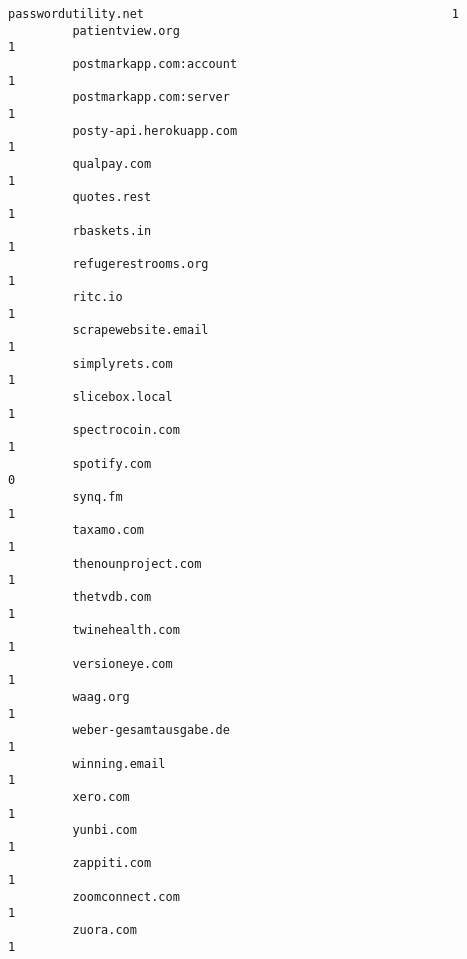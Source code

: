 \documentclass[11pt]{article}
\begin{document}
\begin{Verbatim}[commandchars=\\\{\}]
         passwordutility.net                                           1   
         patientview.org                                               1   
         postmarkapp.com:account                                       1   
         postmarkapp.com:server                                        1   
         posty-api.herokuapp.com                                       1   
         qualpay.com                                                   1   
         quotes.rest                                                   1   
         rbaskets.in                                                   1   
         refugerestrooms.org                                           1   
         ritc.io                                                       1   
         scrapewebsite.email                                           1   
         simplyrets.com                                                1   
         slicebox.local                                                1   
         spectrocoin.com                                               1   
         spotify.com                                                   0   
         synq.fm                                                       1   
         taxamo.com                                                    1   
         thenounproject.com                                            1   
         thetvdb.com                                                   1   
         twinehealth.com                                               1   
         versioneye.com                                                1   
         waag.org                                                      1   
         weber-gesamtausgabe.de                                        1   
         winning.email                                                 1   
         xero.com                                                      1   
         yunbi.com                                                     1   
         zappiti.com                                                   1   
         zoomconnect.com                                               1   
         zuora.com                                                     1   
         

\end{Verbatim}
\end{document}
